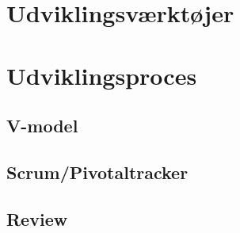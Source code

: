 \section{Udviklingsværktøjer}

\section{Udviklingsproces}

\subsection{V-model}

\subsection{Scrum/Pivotaltracker}

\subsection{Review}
